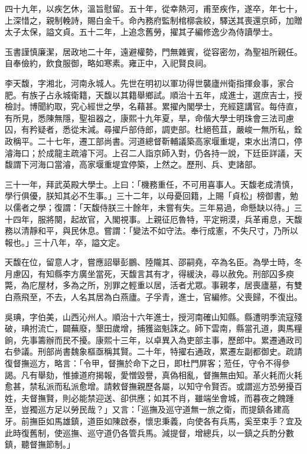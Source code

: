 \begin{pinyinscope}
四十九年，以疾乞休，溫旨慰留。五十年，從幸熱河，甫至疾作，遂卒，年七十，上深惜之，親制輓詩，賜白金千。命內務府監制棺槨衾絞，驛送其喪還京師，加贈太子太保，謚文貞。五十二年，上追念舊勞，擢其子編修逸少為侍讀學士。

玉書謹慎廉潔，居政地二十年，遠避權勢，門無雜賓，從容密勿，為聖祖所親任。自奉儉約，飲食服御，略如寒素。雍正中，入祀賢良祠。

李天馥，字湘北，河南永城人。先世在明初以軍功得世襲廬州衛指揮僉事，家合肥。有族子占永城衛籍，天馥以其籍舉鄉試。順治十五年，成進士，選庶吉士，授檢討。博聞約取，究心經世之學，名藉甚。累擢內閣學士，充經筵講官。每侍直，有所見，悉陳無隱，聖祖器之，康熙十九年夏，旱，命偕大學士明珠會三法司慮囚，有矜疑者，悉從末減。尋擢戶部侍郎，調吏部。杜絕苞苴，嚴峻一無所私，銓政稱平。二十七年，遷工部尚書。河道總督靳輔議築高家堰重堤，束水出清口，停濬海口；於成龍主疏濬下河。上召二人詣京師入對，仍各持一說，下廷臣詳議，天馥謂下河海口當濬，高家堰重堤宜停築，上然之。歷刑、兵、吏諸部。

三十一年，拜武英殿大學士。上曰：「機務重任，不可用喜事人。天馥老成清慎，學行俱優，朕知其必不生事。」三十二年，以母憂回籍，上賜「貞松」榜御書，勉以儒者之學；復謂：「天馥侍朕三十餘年，未嘗有失。三年易過，命懸缺以待。」三十四年，服將闋，起故官，入閣視事。上親征厄魯特，平定朔漠，兵革甫息，天馥務以清靜和平，與民休息。嘗謂：「變法不如守法。奉行成憲，不失尺寸，乃所以報也。」三十八年，卒，謚文定。

天馥在位，留意人才，嘗應詔舉彭鵬、陸隴其、邵嗣堯，卒為名臣。為學士時，冬月慮囚，有知縣李方廣坐當死，天馥言其有才，得緩決，尋以赦免。刑部囚多瘐斃，為庀屋材，多為之所，別罪之輕重以居，活者尤眾。事親孝，居喪廬墓，有雙白燕飛至，不去，人名其居為白燕廬。子孚青，進士，官編修。父喪歸，不復出。

吳琠，字伯美，山西沁州人。順治十六年進士，授河南確山知縣。縣遭明季流寇殘破，琠拊流亡，闢蕪廢，墾田歲增，捕獲盜魁誅之。師下雲南，縣當孔道，輿馬糧餉，先事籌辦而民不擾。康熙十三年，以卓異入為吏部主事，歷郎中。累遷通政司右參議。刑部尚書魏象樞亟稱其賢。二十年，特擢右通政，累遷左副都御史。疏請復督撫巡方，略言：「令甲，督撫於命下之日，即杜門屏客；蒞任，守令不得參謁。凡有舉劾，惟據道府揭報，愛憎毀譽，真偽相亂，督撫無由知。革火耗而火耗愈甚，禁私派而私派愈增。請敕督撫親歷各屬，以知守令賢否。或謂巡方恐勞擾百姓，夫督撫賢，則必能禁迎送、卻供應；如其不肖，雖端坐會城，而暮夜之餽踵至，豈獨巡方足以勞民哉？」又言：「巡撫及巡守道無一旅之衛，而提鎮各建高牙。前撫臣如馬雄鎮，道臣如陳啟泰，懷忠秉義，向使各有兵馬，奚至束手？宜及此時復舊制，使巡撫、巡守道仍各管兵馬。減提督，增總兵，以一鎮之兵酌分數鎮，聽督撫節制。」


\end{pinyinscope}

